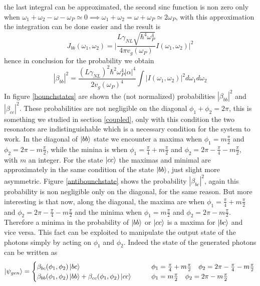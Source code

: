 the last integral can be approximated, the second sinc function is non zero only when $\omega_1+\omega_2 - \omega - \omega_P \simeq 0 \implies  \omega_1+\omega_2 = \omega + \omega_P \simeq 2\omega_P$, with this approximation the integration can be done easier and the result is
\[J_{bb}(\omega_1,\omega_2) = \Bigg|\frac{L\gamma_{NL}\sqrt{\hbar^4\omega_P^4}}{4\pi v_g(\omega_P)}I(\omega_1,\omega_2)\Bigg|^2\]
hence in conclusion for the probability we obtain
\[|\beta_{bb}|^2 = \frac{(L\gamma_{NL})^2\hbar^2\omega_{P}^4 |\alpha|^4}{2v_g(\omega_P)^4}\int |I(\omega_1,\omega_2)|^2d\omega_1 d\omega_2\]
In figure \ref{bounchstates} are shown the (not normalized) probabilities $|\beta_{bb}|^2$ and $|\beta_{cc}|^2$. These probabilities are not negligible on the diagonal $\phi_1 +\phi_2 = 2\pi$, this is something we studied in section \ref{coupled}, only with this condition the two resonators are indistinguishable which is a necessary condition for the system to work. In the diagonal of $\ket{bb}$ state we encounter a maxima when $\phi_1 = m\frac{\pi}{2}$ and $\phi_2 = 2\pi - m\frac{\pi}{2}$, while the minina is when $\phi_1 = \frac{\pi}{4} + m\frac{\pi}{2}$ and $\phi_2 = 2\pi - \frac{\pi}{4} - m\frac{\pi}{2}$, with $m$ an integer. For the state $\ket{cc}$ the maximas and minimal are approximately in the same condition of the state $\ket{bb}$, just slight more asymmetric. Figure \ref{antibounchstate} shows the probability $|\beta_{bc}|^2$, again this probability is non negligible only on the diagonal, for the same reason. But more interesting is that now, along the diagonal, the maxima are when $\phi_1 = \frac{\pi}{4} + m\frac{\pi}{2}$ and $\phi_2 = 2\pi - \frac{\pi}{4} - m\frac{\pi}{2}$ and the minima when $\phi_1 = m\frac{\pi}{2}$ and $\phi_2 = 2\pi - m\frac{\pi}{2}$. Therefore a minima in the probability of $\ket{bb}$ or $\ket{cc}$ is a maxima for $\ket{bc}$ and vice versa. This fact can be exploited to manipulate the output state of the photons simply by acting on $\phi_1$ and $\phi_2$. Indeed the state of the generated photons can be written as
\[\ket{\psi_{gen}} = \begin{cases}
\beta_{bc}(\phi_1,\phi_2)\ket{bc} &\qquad  \phi_1 =  \frac{\pi}{4} + m\frac{\pi}{2} \quad \phi_2 = 2\pi - \frac{\pi}{4} - m\frac{\pi}{2} \\
\beta_{bb}(\phi_1,\phi_2)\ket{bb} +\beta_{cc}(\phi_1,\phi_2)\ket{cc} &\qquad \phi_1 = m\frac{\pi}{2} \quad \phi_2 = 2\pi - m\frac{\pi}{2} \\
\end{cases}\]

